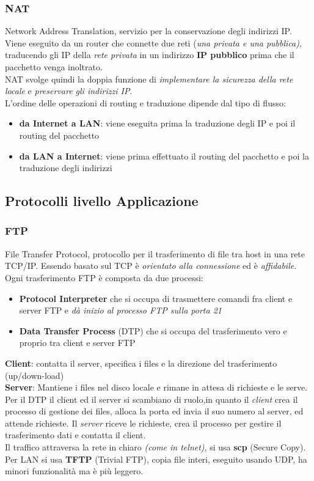 \documentclass[a4paper,11pt]{article}
\begin{document}
\subsubsection{NAT}
Network Address Translation, servizio per la conservazione degli indirizzi IP. Viene eseguito da un router che connette due reti (\textit{una privata e una pubblica)}, traducendo gli IP della \textit{rete privata} in un indirizzo \textbf{IP pubblico} prima che il pacchetto venga inoltrato.\\
NAT svolge quindi la doppia funzione di \textit{implementare la sicurezza della rete locale} e \textit{preservare gli indirizzi IP}.\\
L'ordine delle operazioni di routing e traduzione dipende dal tipo di flusso:
\begin{itemize}
\item\textbf{da Internet a LAN}: viene eseguita prima la traduzione degli IP e poi il routing del pacchetto
\item\textbf{da LAN a Internet}: viene prima effettuato il routing del pacchetto e poi la traduzione degli indirizzi
\end{itemize}

\newpage



\subsection{Protocolli livello Applicazione}
\subsubsection{FTP}
File Transfer Protocol, protocollo per il trasferimento di file tra host in una rete TCP/IP. Essendo basato sul TCP è \textit{orientato alla connessione} ed è \textit{affidabile}.\\
Ogni trasferimento FTP è composta da due processi:
\begin{itemize}
\item\textbf{Protocol Interpreter} che si occupa di trasmettere comandi fra client e server FTP e  \textit{dà inizio al processo FTP sulla porta 21}
\item\textbf{Data Transfer Process} (DTP) che si occupa del trasferimento vero e proprio tra client e server FTP
\end{itemize}
\textbf{Client}: contatta il server, specifica i files e la direzione del trasferimento (up/down-load)\\
\textbf{Server}: Mantiene i files nel disco locale e rimane in attesa di richieste e le serve.
Per il DTP il client ed il server si scambiano di ruolo,in quanto il \textit{client} crea il processo di gestione dei files, alloca la porta ed invia il suo numero al server, ed attende richieste. Il \textit{server} riceve le richieste, crea il processo per gestire il trasferimento dati e contatta il client.\\
Il traffico attraversa la rete in chiaro \textit{(come in telnet)}, si usa \textbf{scp} (Secure Copy).\\
Per LAN si usa \textbf{TFTP} (Trivial FTP), copia file interi, eseguito usando UDP, ha minori funzionalità ma è più leggero.
\newpage
\end{document}
